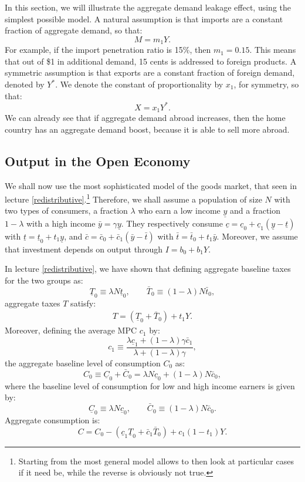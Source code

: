 \documentclass[]{book}
\let\rmarkdownfootnote\footnote%
\def\footnote{\protect\rmarkdownfootnote}
\theoremstyle{definition}
\theoremstyle{definition}
\theoremstyle{definition}
\theoremstyle{remark}
\begin{document}
In this section, we will illustrate the aggregate demand leakage effect,
using the simplest possible model. A natural assumption is that imports
are a constant fraction of aggregate demand, so that: \[M = m_1 Y.\] For
example, if the import penetration ratio is 15\%, then \(m_1 = 0.15\).
This means that out of \$1 in additional demand, 15 cents is addressed
to foreign products. A symmetric assumption is that exports are a
constant fraction of foreign demand, denoted by \(Y^{*}\). We denote the
constant of proportionality by \(x_1\), for symmetry, so that:
\[X=x_1 Y^{*}.\] We can already see that if aggregate demand abroad
increases, then the home country has an aggregate demand boost, because
it is able to sell more abroad.

\subsection{Output in the Open Economy}\label{output-open}

We shall now use the most sophisticated model of the goods market, that
seen in lecture \ref{redistributive}.\footnote{Starting from the most
  general model allows to then look at particular cases if it need be,
  while the reverse is obviously not true.} Therefore, we shall assume a
population of size \(N\) with two types of consumers, a fraction
\(\lambda\) who earn a low income \(\underline{y}\) and a fraction
\(1-\lambda\) with a high income \(\bar{y}=\gamma \underline{y}\). They
respectively consume
\(\underline{c} = \underline{c}_0 + \underline{c}_1 (\underline{y} - \underline{t})\)
with \(\underline{t} = \underline{t}_0 + t_1 \underline{y}\), and
\(\bar{c} = \bar{c}_0 + \bar{c}_1 (\bar{y} - \bar{t})\) with
\(\bar{t} = \bar{t}_0 + t_1 \bar{y}\). Moreover, we assume that
investment depends on output through \(I=b_0+b_1 Y\).

In lecture \ref{redistributive}, we have shown that defining aggregate
baseline taxes for the two groups as:
\[\underline{T}_0\equiv\lambda  N \underline{t}_0, \qquad \bar{T}_0\equiv(1-\lambda) N \bar{t}_0,\]
aggregate taxes \(T\) satisfy: \[
\begin{aligned}
\boxed{T=\left(\underline{T}_{0}+\bar{T}_{0}\right)+t_1 Y}.
\end{aligned}
\] Moreover, defining the average MPC \(c_1\) by:
\[c_{1}\equiv\frac{\lambda\underline{c}_{1}+\left(1-\lambda\right)\gamma\bar{c}_{1}}{\lambda+(1-\lambda)\gamma},\]
the aggregate baseline level of consumption \(C_0\) as:
\[C_{0} \equiv \underline{C}_0 +  \bar{C}_0 = \lambda  N \underline{c}_0 + (1-\lambda) N \bar{c}_0,\]
where the baseline level of consumption for low and high income earners
is given by:
\[\underline{C}_0\equiv \lambda  N \underline{c}_0, \qquad \bar{C}_0\equiv (1-\lambda) N \bar{c}_0.\]
Aggregate consumption is:
\[\boxed{C = C_0 -\left(\underline{c}_{1}\underline{T}_0+\bar{c}_{1}\bar{T}_0\right)+c_1 (1-t_1) Y}.\]
\end{document}
